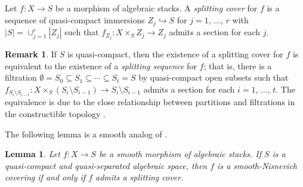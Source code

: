 \documentclass[10pt]{amsart}
\theoremstyle{plain}
\newtheorem{lemma}[thm]{Lemma}
\theoremstyle{definition}
\newtheorem{remark}[thm]{Remark}
\newcommand{\spref}[1]{\href{http://stacks.math.columbia.edu/tag/#1}{#1}}
\begin{document}
Let $f \colon X \to S$ be a morphism of algebraic stacks. A
\emph{splitting cover} for $f$ is a sequence of quasi-compact immersions
$Z_j \hookrightarrow S$ for $j=1$, $\dots$, $r$ with
$|S|=\cup_{j=1}^r |Z_j|$ such that
$f_{Z_j} \colon X\times_S Z_j \to Z_j$ admits a section for each $j$.
\begin{remark}\label{R:splitting-sequence}
	If $S$ is quasi-compact, then the existence of a splitting cover
	for $f$ is equivalent to the existence of a \emph{splitting
		sequence} for $f$; that is, there is a filtration
	$\emptyset = S_0 \subseteq S_1 \subseteq \cdots \subseteq S_t = S$
	by quasi-compact open subsets such that
	$f_{S_{i}\setminus S_{i-1}} \colon X \times_S (S_{i}\setminus
	S_{i-1}) \to S_i\setminus S_{i-1}$ admits a section for each $i=1$,
	$\dots$, $t$. The equivalence is due to the close relationship
	between partitions and filtrations in the constructible topology
	\cite[Tag \spref{09XY}]{stacks-project}.
\end{remark}
The
following lemma is a smooth analog of \cite[Prop.~3.3]{MR3754421}.
\begin{lemma}\label{L:split-covering-sm}
	Let $f \colon X \to S$ be a smooth morphism of algebraic stacks. If
	$S$ is a quasi-compact and quasi-separated algebraic space, then $f$ is a
	smooth-Nisnevich covering if and only if $f$ admits a splitting
	cover.
\end{lemma}
\end{document}
